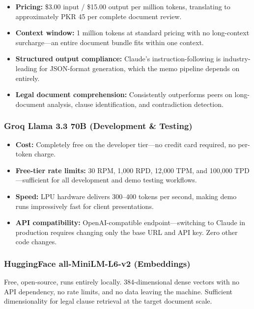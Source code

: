 \documentclass[12pt, a4paper]{article}
\begin{document}
\begin{itemize}[leftmargin=1.5cm]
    \item \textbf{Pricing:} \$3.00 input / \$15.00 output per million tokens,
    translating to approximately PKR 45 per complete document review.
    \item \textbf{Context window:} 1 million tokens at standard pricing with no
    long-context surcharge---an entire document bundle fits within one context.
    \item \textbf{Structured output compliance:} Claude's instruction-following
    is industry-leading for JSON-format generation, which the memo pipeline
    depends on entirely.
    \item \textbf{Legal document comprehension:} Consistently outperforms peers
    on long-document analysis, clause identification, and contradiction detection.
\end{itemize}

\subsubsection{Groq Llama 3.3 70B (Development \& Testing)}

\begin{itemize}[leftmargin=1.5cm]
    \item \textbf{Cost:} Completely free on the developer tier---no credit card
    required, no per-token charge.
    \item \textbf{Free-tier rate limits:} 30 RPM, 1,000 RPD, 12,000 TPM, and
    100,000 TPD---sufficient for all development and demo testing workflows.
    \item \textbf{Speed:} LPU hardware delivers 300--400 tokens per second,
    making demo runs impressively fast for client presentations.
    \item \textbf{API compatibility:} OpenAI-compatible endpoint---switching to
    Claude in production requires changing only the base URL and API key. Zero
    other code changes.
\end{itemize}

\subsubsection{HuggingFace all-MiniLM-L6-v2 (Embeddings)}

Free, open-source, runs entirely locally. 384-dimensional dense vectors with no
API dependency, no rate limits, and no data leaving the machine. Sufficient
dimensionality for legal clause retrieval at the target document scale.
\end{document}
